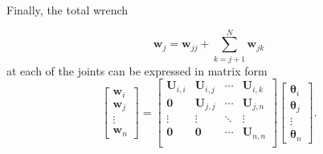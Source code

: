 Finally, the total wrench 

\begin{equation}
	\bm{w}_{j} = \bm{w}_{jj} + \sum_{k=j+1}^{N} \bm{w}_{jk} 
	\label{eq:wrench_link_i}
\end{equation}
at each of the joints can be expressed in matrix form
\begin{equation}
	\begin{bmatrix}
		\bm{w}_{i}\\
		\bm{w}_{j}\\
		\vdots \\
		\bm{w}_{n}
	\end{bmatrix} = 
	\begin{bmatrix}
		\bm{U}_{i,i} & \bm{U}_{i,j} & \cdots & \bm{U}_{i,k}\\
		\bm{0}       & \bm{U}_{j,j} & \cdots & \bm{U}_{j,n}\\
		\vdots       & \vdots       & \ddots & \vdots      \\
		\bm{0}       & \bm{0}       & \cdots & \bm{U}_{n,n}\\
	\end{bmatrix}
	\begin{bmatrix}
		\bm{\theta}_{i}\\
		\bm{\theta}_{j}\\
		\vdots \\
		\bm{\theta}_{n}
	\end{bmatrix}.
	\label{eq:wrench_inverse_dynamics}
\end{equation}

